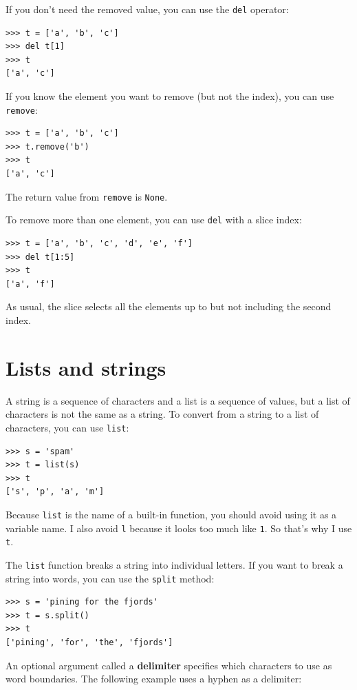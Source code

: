 \documentclass[10pt]{book}
\begin{document}
If you don't need the removed value, you can use the {\tt del}
operator:

\begin{verbatim}
>>> t = ['a', 'b', 'c']
>>> del t[1]
>>> t
['a', 'c']
\end{verbatim}
%
If you know the element you want to remove (but not the index), you
can use {\tt remove}:

\begin{verbatim}
>>> t = ['a', 'b', 'c']
>>> t.remove('b')
>>> t
['a', 'c']
\end{verbatim}
%
The return value from {\tt remove} is {\tt None}.

To remove more than one element, you can use {\tt del} with
a slice index:

\begin{verbatim}
>>> t = ['a', 'b', 'c', 'd', 'e', 'f']
>>> del t[1:5]
>>> t
['a', 'f']
\end{verbatim}
%
As usual, the slice selects all the elements up to but not
including the second index.



\section{Lists and strings}

A string is a sequence of characters and a list is a sequence
of values, but a list of characters is not the same as a
string.  To convert from a string to a list of characters,
you can use {\tt list}:

\begin{verbatim}
>>> s = 'spam'
>>> t = list(s)
>>> t
['s', 'p', 'a', 'm']
\end{verbatim}
%
Because {\tt list} is the name of a built-in function, you should
avoid using it as a variable name.  I also avoid {\tt l} because
it looks too much like {\tt 1}.  So that's why I use {\tt t}.

The {\tt list} function breaks a string into individual letters.  If
you want to break a string into words, you can use the {\tt split}
method:

\begin{verbatim}
>>> s = 'pining for the fjords'
>>> t = s.split()
>>> t
['pining', 'for', 'the', 'fjords']
\end{verbatim}
%
An optional argument called a {\bf delimiter} specifies which
characters to use as word boundaries.
The following example
uses a hyphen as a delimiter:
\end{document}
